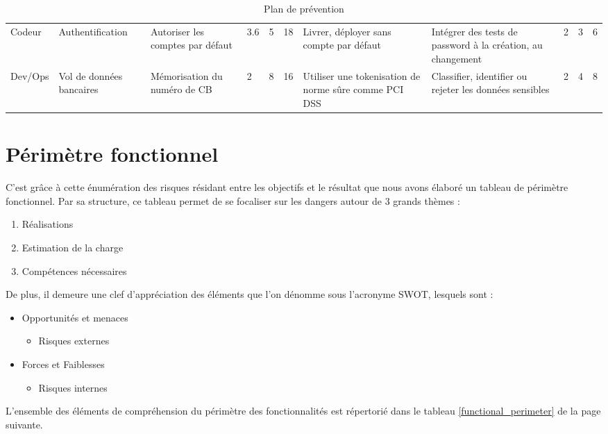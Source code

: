 \documentclass[12pt]{article}
\begin{document}
\begin{landscape}
\begin{table}[H]
{\begin{tabular}{p{1cm} p{2cm} p{2cm} p{1.5cm} p{1cm}p{1cm}p{4cm}p{3.3cm} p{1.3cm}p{1cm} p{1cm}}
Codeur & Authentification & Autoriser les comptes par défaut & 3.6 & 5 & \cellcolor{red!75} 18 & Livrer, déployer sans compte par défaut & Intégrer des tests de password à la création, au changement & 2 & 3 & \cellcolor{yellow!50} 6 \\ 
Dev/Ops & Vol de données bancaires & Mémorisation du numéro de CB & 2 & 8 & \cellcolor{red!75} 16 & Utiliser une tokenisation de norme sûre comme PCI DSS & Classifier, identifier ou rejeter les données sensibles & 2 & 4 & \cellcolor{yellow!50} 8 \\ 
\hline
\end{tabular}
}
\caption{Plan de prévention}
\label{plan_de_prevention}
\end{table}
\end{landscape}

\section{Périmètre fonctionnel}
C’est grâce à cette énumération des risques résidant entre les objectifs et le résultat que nous avons élaboré un tableau de périmètre fonctionnel.
Par sa structure, ce tableau permet de se focaliser sur les dangers autour de 3 grands thèmes :
\begin{enumerate}
	\item Réalisations
	\item Estimation de la charge
	\item Compétences nécessaires
\end{enumerate}

De plus, il demeure une clef d’appréciation des éléments que l’on dénomme sous l’acronyme SWOT, lesquels sont :
\begin{itemize}
	\item Opportunités et menaces
	\begin{itemize}
		\item Risques externes
	\end{itemize}
	\item Forces et Faiblesses
	\begin{itemize}
		\item Risques internes
	\end{itemize}
\end{itemize}

L’ensemble des éléments de compréhension du périmètre des fonctionnalités est répertorié dans le tableau \ref{functional_perimeter} de la page suivante.
\end{document}
